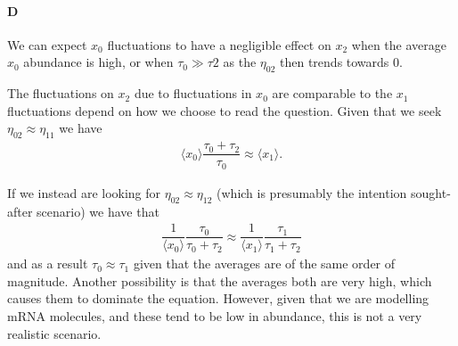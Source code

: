 \documentclass[10pt]{article}\usepackage[]{graphicx}\usepackage[]{color}
\newcommand{\avg}[1]{\ensuremath{\langle {#1} \rangle}} %
\theoremstyle{plain}
\begin{document}
  \paragraph*{D}
  We can expect $x_0$ fluctuations to have a negligible effect on $x_2$ when the average $x_0$ abundance is high, or when $\tau_0 \gg \tau2$ as the $\eta_{02}$ then trends towards 0. 
  
  The fluctuations on $x_2$ due to fluctuations in $x_0$ are comparable to the $x_1$ fluctuations depend on how we choose to read the question. Given that we seek $\eta_{02} \approx \eta_{11}$ we have
  \begin{align*}
    \avg{x_0} \dfrac{\tau_0 + \tau_2}{\tau_0} \approx \avg{x_1}.
  \end{align*}
  
  If we instead are looking for $\eta_{02} \approx \eta_{12}$ (which is presumably the intention sought-after scenario) we have that
  \begin{align*}
    \dfrac{1}{\avg{x_0}}\dfrac{\tau_0}{\tau_0 + \tau_2} \approx \dfrac{1}{\avg{x_1}}\dfrac{\tau_1}{\tau_1 + \tau_2}
  \end{align*}
  and as a result $\tau_0 \approx \tau_1$ given that the averages are of the same order of magnitude. Another possibility is that the averages both are very high, which causes them to dominate the equation. However, given that we are modelling mRNA molecules, and these tend to be low in abundance, this is not a very realistic scenario.

\end{document}

